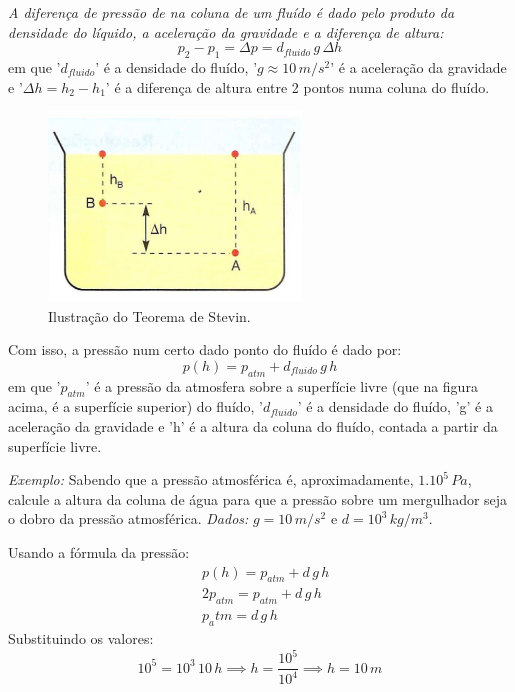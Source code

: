 \documentclass[12pt]{extarticle}
\newcommand{\<}{\langle}
\renewcommand{\>}{\rangle}
\theoremstyle{definition}
\begin{document}
\textit{A diferença de pressão de na coluna de um fluído é dado pelo produto da densidade do líquido, a aceleração da gravidade e a diferença de altura:}
\begin{equation}
    p_2 - p_1 = \Delta p= d_{fluido}\,g\,\Delta h
\end{equation}
\noindent em que '$d_{fluido}$' é a densidade do fluído, '$g\approx 10\,m/s^2$' é a aceleração da gravidade e '$\Delta h = h_2 - h_1$' é a diferença de altura entre 2 pontos numa coluna do fluído.
\begin{figure}[H]
    \centering
    \includegraphics[width=0.6\textwidth]{teorema-de-stevin-1.jpg}
    \caption{Ilustração do Teorema de Stevin.}
    \label{fig:stevin}
\end{figure}

Com isso, a pressão num certo dado ponto do fluído é dado por:
\begin{equation}
    p(h) = p_{atm} + d_{fluido}\,g\,h
\end{equation}
\noindent em que '$p_{atm}$' é a pressão da atmosfera sobre a superfície livre (que na figura acima, é a superfície superior) do fluído, '$d_{fluido}$' é a densidade do fluído, 'g' é a aceleração da gravidade e 'h' é a altura da coluna do fluído, contada a partir da superfície livre.

\textit{Exemplo:} Sabendo que a pressão atmosférica é, aproximadamente, $1.10^5\,Pa$, calcule a altura da coluna de água para que a pressão sobre um mergulhador seja o dobro da pressão atmosférica. \textit{Dados:} $g=10\,m/s^2$ e $d = 10^3\,kg/m^3$.

Usando a fórmula da pressão:
\begin{equation}
    \begin{split}
        &p(h) = p_{atm} + d\,g\,h\\
        &2p_{atm} = p_{atm} + d\,g\,h\\
        &p_atm = d\,g\,h
    \end{split}
\end{equation}
Substituindo os valores:
\begin{equation}
    10^5 = 10^3\,10\,h \implies h = \frac{10^5}{10^4} \implies \boxed{h=10\,m}
\end{equation}
\end{document}
